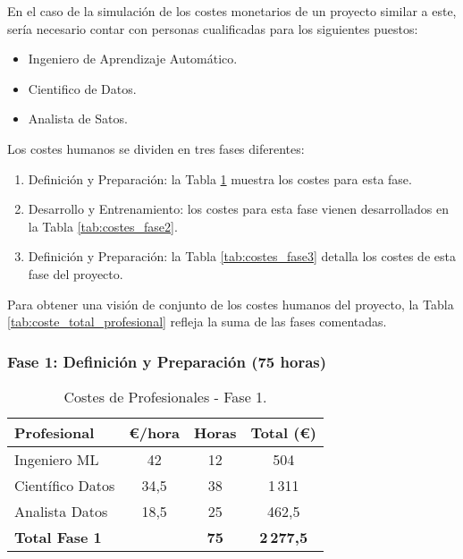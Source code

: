 En el caso de la simulación de los costes monetarios de un proyecto similar a este, sería necesario contar con personas cualificadas para los siguientes puestos:
\begin{itemize}
\item Ingeniero de Aprendizaje Automático.
\item Cientifico de Datos.
\item Analista de Satos.
\end{itemize}

Los costes humanos se dividen en tres fases diferentes:
\begin{enumerate}
	\item Definición y Preparación: la Tabla \ref{tab:costes_fase1} muestra los costes para esta fase.
	\item Desarrollo y Entrenamiento: los costes para esta fase vienen desarrollados en la Tabla \ref{tab:costes_fase2}.
	\item Definición y Preparación: la Tabla \ref{tab:costes_fase3} detalla los costes de esta fase del proyecto.
\end{enumerate}

Para obtener una visión de conjunto de los costes humanos del proyecto, la Tabla \ref{tab:coste_total_profesional} refleja la suma de las fases comentadas.


\subsubsection*{Fase 1: Definición y Preparación (75 horas)}
\begin{table}[H]
\centering
\begin{tabular}{|l|c|c|c|}
\toprule
Profesional & €/hora & Horas & Total (€) \\
\midrule
Ingeniero ML & 42 & 12 & 504 \\
Científico Datos & 34,5 & 38 & 1\,311 \\
Analista Datos & 18,5 & 25 & 462,5 \\
\midrule
\textbf{Total Fase 1} & & \textbf{75} & \textbf{2\,277,5} \\
\bottomrule
\end{tabular}
\caption{Costes de Profesionales - Fase 1.}
\label{tab:costes_fase1}
\end{table}


